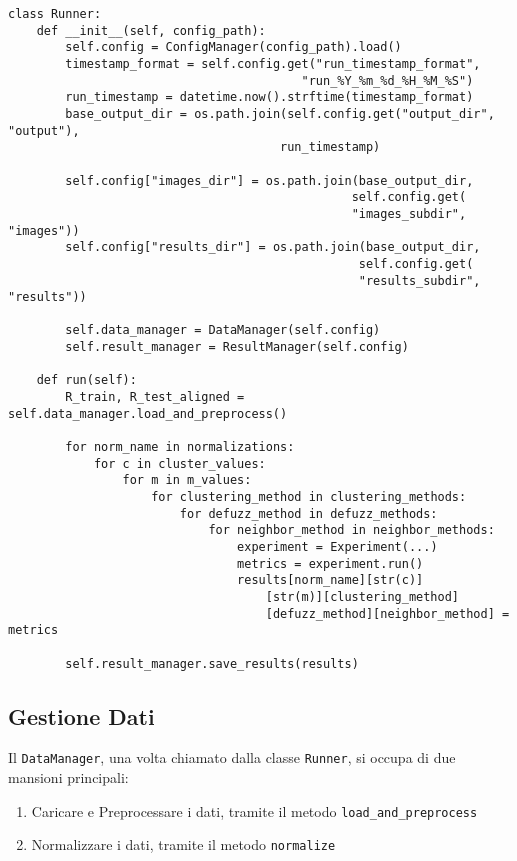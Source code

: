 \begin{lstlisting}[style=PythonStyle, caption=estratti della classe Runner]
class Runner:
    def __init__(self, config_path):
        self.config = ConfigManager(config_path).load()
        timestamp_format = self.config.get("run_timestamp_format", 
                                         "run_%Y_%m_%d_%H_%M_%S")
        run_timestamp = datetime.now().strftime(timestamp_format)
        base_output_dir = os.path.join(self.config.get("output_dir", "output"), 
                                      run_timestamp)
        
        self.config["images_dir"] = os.path.join(base_output_dir, 
                                                self.config.get(
                                                "images_subdir", "images"))
        self.config["results_dir"] = os.path.join(base_output_dir, 
                                                 self.config.get(
                                                 "results_subdir", "results"))
        
        self.data_manager = DataManager(self.config)
        self.result_manager = ResultManager(self.config)

    def run(self):
        R_train, R_test_aligned = self.data_manager.load_and_preprocess()

        for norm_name in normalizations:
            for c in cluster_values:
                for m in m_values:
                    for clustering_method in clustering_methods:
                        for defuzz_method in defuzz_methods:
                            for neighbor_method in neighbor_methods:
                                experiment = Experiment(...)
                                metrics = experiment.run()
                                results[norm_name][str(c)]
                                    [str(m)][clustering_method]
                                    [defuzz_method][neighbor_method] = metrics

        self.result_manager.save_results(results)
\end{lstlisting}

\subsection{Gestione Dati}

Il \texttt{DataManager}, una volta chiamato dalla classe \texttt{Runner}, si occupa di due mansioni principali:
\begin{enumerate}
    \item Caricare e Preprocessare i dati, tramite il metodo \texttt{load\_and\_preprocess}
    \item Normalizzare i dati, tramite il metodo \texttt{normalize}
\end{enumerate}

